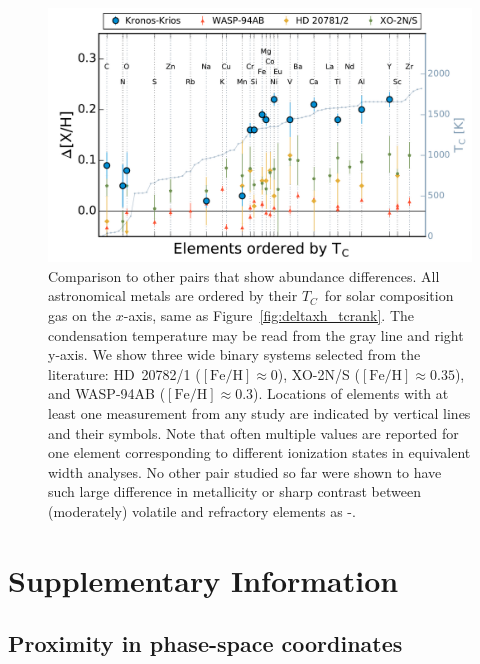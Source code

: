 \documentclass[12pt,letterpaper,margin=1in]{article}
\newcommand{\figname}{Figure}
\newcommand*\elem[1]{\ensuremath{\mathrm{#1}}}
\newcommand*\elemH[1]{\ensuremath{[\mathrm{#1}/\elem{H}]}}
\newcommand*{\feh}{\ensuremath{\elemH{Fe}}}
\newcommand{\sunanalog}{\text{Krios}}
\newcommand{\bizarreone}{\text{Kronos}}
\newcommand{\Tcondens}{\ensuremath{T_C}}
\begin{document}
\begin{figure}[htpb]
  \centering
  \includegraphics[width=0.95\linewidth]{TcRank_deltaXH_concise.pdf}
  \caption{Comparison to other pairs that show abundance differences.
    All astronomical metals are ordered by their \Tcondens\ for solar
    composition gas\cite{2003ApJ...591.1220L} on the $x$-axis, same as \figname~\ref{fig:deltaxh_tcrank}.
    The condensation temperature may be read from the gray line and right y-axis.
    We show three wide binary systems selected from the literature:
    HD~20782/1\cite{Mack:2014aa} ($\feh\approx0$),
    XO-2N/S\cite{Biazzo:2015aa} ($\feh\approx0.35$),
    and WASP-94AB\cite{Teske:2016aa} ($\feh\approx0.3$).
    Locations of elements with at least one measurement from any study
    are indicated by vertical lines and their symbols.
    Note that often multiple values are reported for one element corresponding
    to different ionization states in equivalent width analyses.
    No other pair studied so far were shown to have such large difference
    in metallicity or sharp contrast between (moderately) volatile and
    refractory elements as \bizarreone-\sunanalog.
  }
  \label{fig:relabun_tcrank}
\end{figure}


\clearpage

\section{Supplementary Information}

\subsection{Proximity in phase-space coordinates}
\label{supp:dxdv}
\end{document}
